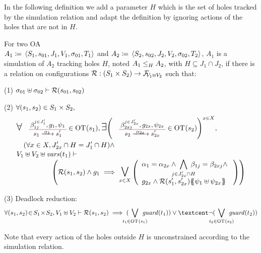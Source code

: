 \documentclass[runningheads]{llncs}
\begin{document}
In the following definition we add a parameter $H$ which is the set of holes tracked by the simulation relation and adapt the definition by ignoring actions of the holes that are not in $H$.
\begin{definition}\label{Def:OA-Refinement}
For two OA\\ \(A_1 \defobject \OA{S_1}{s_{01}}{J_1}{V_1}{\sigma_{01}}{T_1}\) and \(A_2 \defobject \OA{S_2}{s_{02}}{J_2}{V_2}{\sigma_{02}}{T_2}\), \(A_1\) is a simulation of \(A_2\) tracking holes \(H\), noted \(\wrel{A_1}{A_2}{H}\), with \(H \subseteq J_1 \cap J_2\), if there is a relation on configurations $\mathcal{R}: \mpar{S_1 \times S_2} \to \rformulas[V_1 \uplus V_2]$ such that:
\item[(1)] \(\sigma_{01} \uplus \sigma_{02} \vdash \mathcal{R}\mpar{s_{01}, s_{02}}\)
\item[(2)] \(\forall \mpar{s_1, s_2} \in S_1 \times S_2,\)
\begin{multline*}
	\everymath{\displaystyle}\begin{array}{l}
		\bigsymb{\forall} \OTx{1}{}{1}{1} \in \fOT{s_1}, \bigsymb{\exists} \mpar{\OTx{2}{x}{2x}{2x} \in \fOT{s_2}}^{x \in X}, \\[12pt]
		\quad \mpar{\forall x \in X, J'_{2x} \cap H = J'_1 \cap H} \nwedge\\[1pt]
		 V_1 \uplus V_2 \uplus \fvars{t_1} \vdash\\\hspace{5em} \mpar{\mathcal{R}\mpar{s_1, s_2} \wedge g_1 \implies \operatorname*{\bigsymb{\bigvee}}_{x \in X} \mpar{\begin{array}{l}
			\alpha_1 = \alpha_{2x} \wedge \bigwedge_\subbox{j \in J'_{2x} \cap H} \beta_{1j} = \beta_{2xj}   \nwedge\\
			 g_{2x} \wedge \mathcal{R}\mpar{s'_1, s'_{2x}}\psubst{\psi_1 \uplus \psi_{2x}}
		\end{array}}} 
	\end{array} 
\end{multline*}
\item[(3)] Deadlock reduction:
\[
\forall \mpar{s_1, s_2} \!\in\! S_1 \!\times\! S_2, V_1 \uplus V_2  \vdash \mathcal{R}\mpar{s_1, s_2} \implies( \bigvee_\subbox{t_1 \in \fOT{s_1}} \fguard{t_1} ) \lor¢ \lnot( \bigvee_\subbox{t_2 \in \fOT{s_2}} \fguard{t_2}  )
\]
\end{definition}
Note that every action of the holes outside \(H\) is unconstrained according to the simulation relation.

\end{document}
